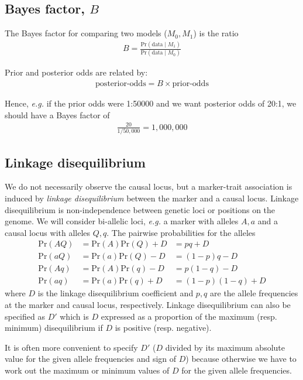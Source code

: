 \documentclass[a4paper,10pt]{amsart}
\def\Pr{\mbox{Pr}}
\def\data{\mbox{data}}
\def\eg{\textit{e.g.}}
\begin{document}
\subsection{Bayes factor, $B$}

The Bayes factor for comparing two models ($M_0,M_1$) is the ratio 
\begin{gather}
B = \frac{\Pr(\data\mid M_1)}{\Pr(\data\mid M_0)}
\end{gather}

Prior and posterior odds are related by:
\begin{gather}
\mbox{posterior-odds} = B \times \mbox{prior-odds}
\end{gather}

Hence, \eg{} if the prior odds were 1:50000 and we want posterior odds of
20:1, we should have a Bayes factor of
\begin{gather}
\frac{20}{1/50,000} = 1,000,000
\end{gather}

\subsection{Linkage disequilibrium}

We do not necessarily observe the causal locus, but a marker-trait
association is induced by \textit{linkage disequilibrium} between the
marker and a causal locus.
Linkage disequilibrium  \citep{Weir1996GeneticDataAnalysisII}
is non-independence between genetic
loci or positions on the genome. We will consider bi-allelic loci,
\eg{} a marker with alleles $A,a$ and a causal locus with alleles $Q,q$.
The pairwise probabilities for the alleles
\begin{align}
\Pr(AQ) &= \Pr(A)\Pr(Q) + D &= pq + D  \\
\Pr(aQ) &= \Pr(a)\Pr(Q) - D &= (1-p)q - D \\
\Pr(Aq) &= \Pr(A)\Pr(q) - D &= p(1-q) - D \\
\Pr(aq) &= \Pr(a)\Pr(q) + D &= (1-p)(1-q) + D
\end{align}
where $D$ is the linkage disequilibrium coefficient and $p,q$ are the
allele frequencies at the marker and causal locus,
respectively. Linkage disequilibrium can also be specified as $D'$
which is $D$ expressed as a proportion of the maximum (resp. minimum)
disequilibrium if $D$ is positive (resp. negative).

It is often more convenient to specify $D'$ ($D$ divided by its
maximum absolute value for the given allele frequencies and sign of
$D$) because otherwise we have to work out the maximum or minimum
values of $D$ for the given allele frequencies.
\end{document}
